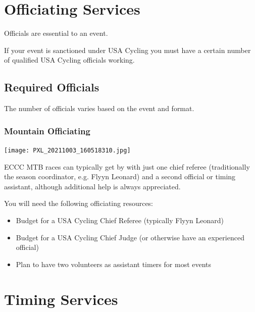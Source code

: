 \documentclass[
  letterpaper, %
  fontsize=10pt, %
  twoside=true,
  chapterentrydots=true, %
  numbers=noenddot,
  fontmethod=tex,
]{kaobook}
\begin{document}
\section{Officiating Services}

Officials are essential to an event.

If your event is sanctioned %
under USA Cycling
you must have a certain number of qualified USA Cycling officials working.

\subsection{Required Officials}

The number of officials varies based on the event and format.

\subsubsection{Mountain Officiating}

\begin{marginfigure}
\texttt{[image: PXL\_20211003\_160518310.jpg]}
\caption[MTB STXC Finish Line]{
          A Short-Track Cross Country %
          finish line can be run with a very small crew.\\
          Credit: Katie Aman}
\end{marginfigure}

ECCC MTB races can typically get by with just one chief referee
(traditionally the season coordinator, e.g. Flyyn Leonard)
and a second official or timing assistant,
although additional help is always appreciated.

\begin{kaobox}[title=Note for Team-Hosted MTB Races]
You will need the following officiating resources:

\begin{itemize}
  \item Budget for a USA Cycling Chief Referee (typically Flyyn Leonard)
  \item Budget for a USA Cycling Chief Judge (or otherwise have an experienced official)
  \item Plan to have two volunteers as assistant timers for most events
\end{itemize}
\end{kaobox}

\section{Timing Services}
\end{document}

